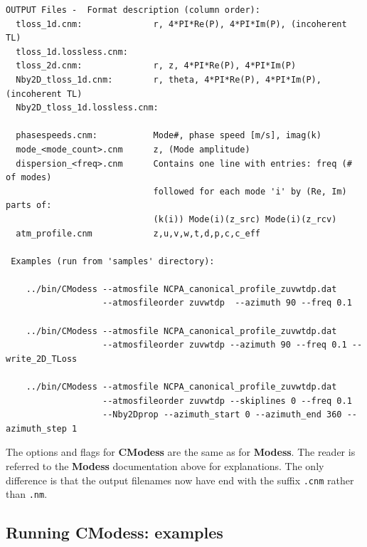 \begin{verbatim}
OUTPUT Files -  Format description (column order):
  tloss_1d.cnm:              r, 4*PI*Re(P), 4*PI*Im(P), (incoherent TL)
  tloss_1d.lossless.cnm:
  tloss_2d.cnm:              r, z, 4*PI*Re(P), 4*PI*Im(P)
  Nby2D_tloss_1d.cnm:        r, theta, 4*PI*Re(P), 4*PI*Im(P), (incoherent TL)
  Nby2D_tloss_1d.lossless.cnm:

  phasespeeds.cnm:           Mode#, phase speed [m/s], imag(k)
  mode_<mode_count>.cnm      z, (Mode amplitude)
  dispersion_<freq>.cnm      Contains one line with entries: freq (# of modes)
                             followed for each mode 'i' by (Re, Im) parts of: 
                             (k(i)) Mode(i)(z_src) Mode(i)(z_rcv)
  atm_profile.cnm            z,u,v,w,t,d,p,c,c_eff

 Examples (run from 'samples' directory):

    ../bin/CModess --atmosfile NCPA_canonical_profile_zuvwtdp.dat 
                   --atmosfileorder zuvwtdp  --azimuth 90 --freq 0.1

    ../bin/CModess --atmosfile NCPA_canonical_profile_zuvwtdp.dat 
                   --atmosfileorder zuvwtdp --azimuth 90 --freq 0.1 --write_2D_TLoss

    ../bin/CModess --atmosfile NCPA_canonical_profile_zuvwtdp.dat 
                   --atmosfileorder zuvwtdp --skiplines 0 --freq 0.1 
                   --Nby2Dprop --azimuth_start 0 --azimuth_end 360 --azimuth_step 1 
\end{verbatim}

The options and flags for {\bf CModess} are the same as for {\bf Modess}. The reader is referred to the {\bf Modess} documentation above for explanations. The only difference is that the output filenames now have end with the suffix \verb+.cnm+ rather than \verb+.nm+. 

\subsection{Running CModess: examples}
\label{sec: cmodess examples}

